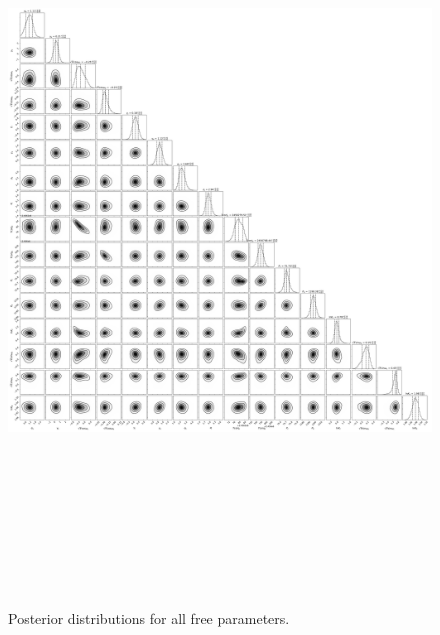 \documentclass{emulateapj}
\begin{document}
\begin{figure}[!h]
\centering
\includegraphics[height=8.0in,width=6.0in,keepaspectratio]{HD164922_corner.pdf}
\caption{Posterior distributions for all free parameters.}
\end{figure}

\end{document}
